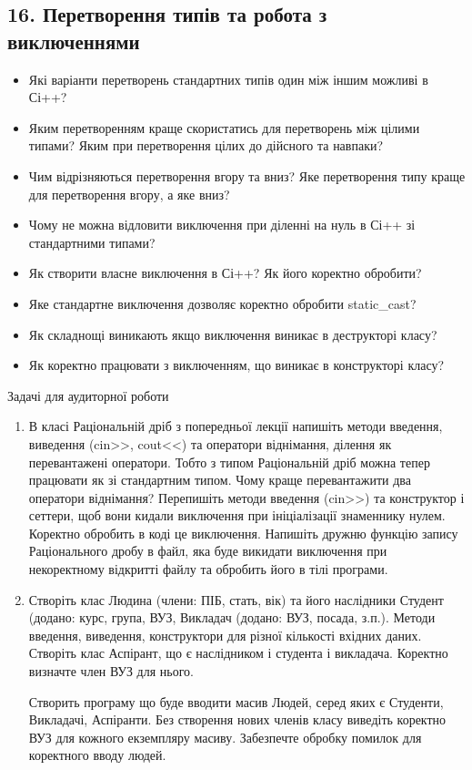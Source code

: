 \documentclass[]{article}
\date{}
\begin{document}
\newpage
\subsection{16. Перетворення типів та робота з виключеннями}
\setcounter{subsection}{1}



\begin{itemize}
\item
  Які варіанти перетворень стандартних типів один між іншим можливі в
  Сі++?
\item
  Яким перетворенням краще скористатись для перетворень між цілими
  типами? Яким при перетворення цілих до дійсного та навпаки?
\item
  Чим відрізняються перетворення вгору та вниз? Яке перетворення типу
  краще для перетворення вгору, а яке вниз?
\item
  Чому не можна відловити виключення при діленні на нуль в Сі++ зі
  стандартними типами?
\item
  Як створити власне виключення в Сі++? Як його коректно обробити?
\item
  Яке стандартне виключення дозволяє коректно обробити static\_cast?
\item
  Як складнощі виникають якщо виключення виникає в деструкторі класу?
\item
  Як коректно працювати з виключенням, що виникає в конструкторі класу?
\end{itemize}

Задачі для аудиторної роботи

\begin{enumerate}
\def\labelenumi{\arabic{enumi})}

\item
  В класі Раціональній дріб з попередньої лекції напишіть методи
  введення, виведення (cin\textgreater{}\textgreater{},
  cout\textless{}\textless{}) та оператори віднімання, ділення як
  перевантажені оператори. Тобто з типом Раціональній дріб можна тепер
  працювати як зі стандартним типом. Чому краще перевантажити два
  оператори віднімання? Перепишіть методи введення
  (cin\textgreater{}\textgreater{}) та конструктор і сеттери, щоб вони
  кидали виключення при ініціалізації знаменнику нулем. Коректно
  обробить в коді це виключення. Напишіть дружню функцію запису
  Раціонального дробу в файл, яка буде викидати виключення при
  некоректному відкритті файлу та обробить його в тілі програми.

\item
  Створіть клас Людина (члени: ПІБ, стать, вік) та його наслідники
  Студент (додано: курс, група, ВУЗ, Викладач (додано: ВУЗ, посада,
  з.п.). Методи введення, виведення, конструктори для різної кількості
  вхідних даних. Створіть клас Аспірант, що є наслідником і студента і викладача.
 Коректно визначте член ВУЗ для нього. 

 Створить програму що буде вводити масив Людей, серед яких є Студенти,
Викладачі, Аспіранти. Без створення нових членів класу виведіть коректно
ВУЗ для кожного екземпляру масиву. Забезпечте обробку помилок для коректного вводу людей.
\end{enumerate}
\end{document}
